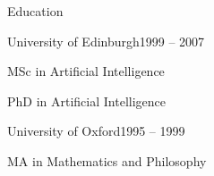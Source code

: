 \documentclass{resume} %
\begin{document}

\begin{rSection}{Education}
\begin{rSubsection}{University of Edinburgh}{1999 -- 2007}{}{}
\item MSc in Artificial Intelligence
\item PhD in Artificial Intelligence
\end{rSubsection}

\begin{rSubsection}{University of Oxford}{1995 -- 1999}{}{}
\item MA in Mathematics and Philosophy
\end{rSubsection}
\end{rSection}

\end{document}
